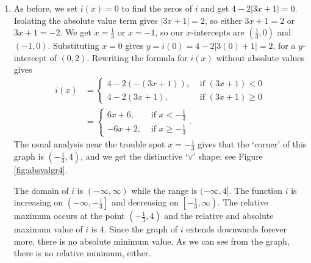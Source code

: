 {\begin{enumerate}

Once again, the open circle at $(0,-3)$ from one piece of the graph of $h$ is filled by the point $(0,-3)$ from the other piece of $h$.  From the graph, we determine the domain of $h$ is $(-\infty, \infty)$ and the range is $[-3,\infty)$.   On $[0,\infty)$, $h$ is increasing;  on $(-\infty,0]$ it is decreasing.  The relative minimum occurs at the point $(0,-3)$ on the graph, and we see $-3$ is both the relative and absolute minimum value of $h$.  Also, $h$ has no relative or absolute maximum value.



\item As before, we set $i(x)=0$ to find the zeros of $i$ and get $4 - 2|3x+1|=0$.  Isolating the absolute value term gives $|3x+1|=2$, so either  $3x+1 = 2$ or $3x+1=-2$.  We get $x=\frac{1}{3}$ or $x=-1$, so our $x$-intercepts are $\left(\frac{1}{3},0\right)$ and $(-1,0)$.  Substituting $x=0$ gives $y = i(0) = 4-2|3(0)+1| = 2$, for a $y$-intercept of $(0,2)$.  Rewriting the formula for $i(x)$ without absolute values gives  
\begin{align*}
i(x) & = \begin{cases}
		 4-2(-(3x+1)), & \mbox{ if }  (3x+1) <0  \\
		 4-2(3x+1), & \mbox{ if }  (3x+1) \geq 0 
		 \end{cases}\\
     & = \begin{cases}
     	 6x+6, & \mbox{ if }  x < -\frac{1}{3} \\
     	-6x+2, & \mbox{ if }  x \geq - \frac{1}{3}
     	 \end{cases}.
\end{align*}
The usual analysis near the trouble spot $x=-\frac{1}{3}$ gives that the `corner' of this graph is  $\left( -\frac{1}{3}, 4\right)$, and we get the distinctive `$\vee$' shape: see Figure \ref{fig:absvalgr4}.



The domain of $i$ is $(-\infty, \infty)$ while the range is $(-\infty, 4]$. The function $i$ is increasing on $\left(-\infty, -\frac{1}{3}\right]$ and decreasing on $\left[ -\frac{1}{3}, \infty\right)$.  The relative maximum occurs at the point $\left(-\frac{1}{3}, 4\right)$ and the relative and absolute maximum value of $i$ is $4$.  Since the graph of $i$ extends downwards forever more, there is no absolute minimum value.  As we can see from the graph, there is no relative minimum, either. 

\end{enumerate}
}


